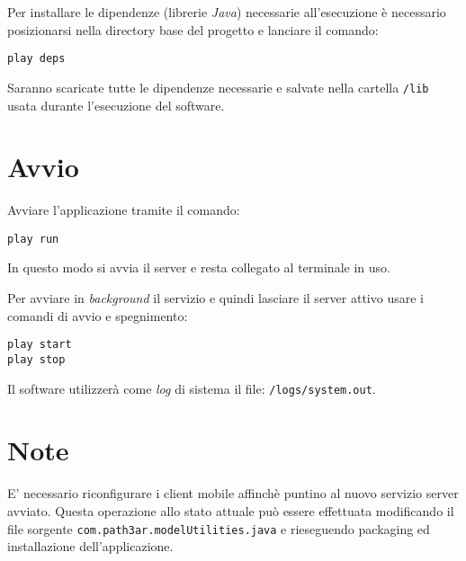 Per installare le dipendenze (librerie \emph{Java}) necessarie all'esecuzione è necessario posizionarsi nella directory base del progetto e lanciare il comando:
\begin{verbatim}
play deps
\end{verbatim}
Saranno scaricate tutte le dipendenze necessarie e salvate nella cartella \texttt{/lib} usata durante l'esecuzione del software.

\section{Avvio}
Avviare l'applicazione tramite il comando:
\begin{verbatim}
play run
\end{verbatim}
In questo modo si avvia il server e resta collegato al terminale in uso. 

Per avviare in \emph{background} il servizio e quindi lasciare il server attivo usare i comandi di avvio e spegnimento:
\begin{verbatim}
play start
play stop
\end{verbatim}

Il software utilizzerà come \emph{log} di sistema il file: \texttt{/logs/system.out}.

\section{Note}
E' necessario riconfigurare i client mobile affinchè puntino al nuovo servizio server avviato. Questa operazione allo stato attuale può essere effettuata modificando il file sorgente \texttt{com.\-path3ar.\-model\-Utilities.java} e rieseguendo packaging ed installazione dell'applicazione.
